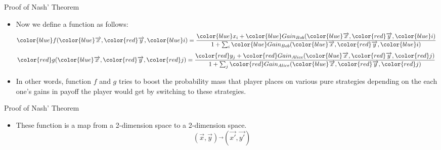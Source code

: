 \documentclass{beamer}
\begin{document}
\begin{frame}[fragile]{Proof of Nash' Theorem}
	\begin{itemize}[<+->]
		\item Now we define a function as follows:
		 \begin{equation}
		 {\color{blue}f}({\color{blue}\overrightarrow{x}}, {\color{red}\overrightarrow{y}}, {\color{blue}i}) = \frac{{\color{blue}x_i} + {\color{blue}Gain_{Bob}} ({\color{blue}\overrightarrow{x}}, {\color{red}\overrightarrow{y}}, {\color{blue}i})}{1 + \sum_i{\color{blue}Gain_{Bob}} ({\color{blue}\overrightarrow{x}}, {\color{red}\overrightarrow{y}}, {\color{blue}i})}\ \  \ \ \ \ \ \nonumber
		 \end{equation}
		 \begin{equation}
		 {\color{red}g}({\color{blue}\overrightarrow{x}}, {\color{red}\overrightarrow{y}}, {\color{red}j}) = \frac{{\color{red}y_j} + {\color{red}Gain_{Alice}} ({\color{blue}\overrightarrow{x}}, {\color{red}\overrightarrow{y}}, {\color{red}j})}{1 + \sum_j{\color{red}Gain_{Alice}} ({\color{blue}\overrightarrow{x}}, {\color{red}\overrightarrow{y}}, {\color{red}j})}\ \  \ \ \ \ \ \nonumber
		 \end{equation}
		\item In other words, function $f$ and $g$ tries to boost the probability mass that player places on various pure strategies
		depending on the each one's gains in payoff the player would get by switching to these strategies.
	\end{itemize}
\end{frame}

\begin{frame}[fragile]{Proof of Nash' Theorem}
	\begin{itemize}[<+->]
		\item These function is a map from a 2-dimension space to a 2-dimension space.
		\begin{equation}
		(\overrightarrow{x}, \overrightarrow{y}) \overrightarrow{}(\overrightarrow{x'}, \overrightarrow{y'})\ \  \ \ \ \ \  \nonumber
		\end{equation}
	\end{itemize}
\end{frame}
\end{document}
